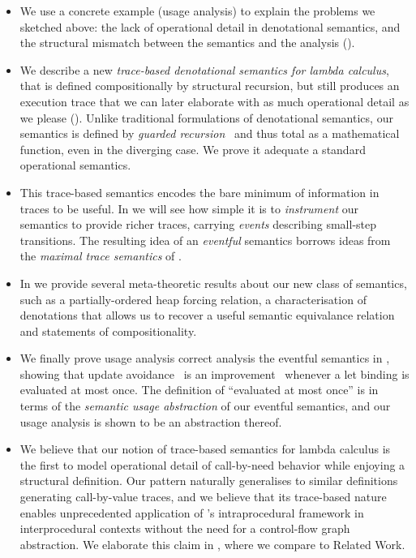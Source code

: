 \begin{itemize}
\item We use a concrete example (usage analysis) to explain the problems we sketched
  above: the lack of operational detail in denotational semantics, and the structural mismatch
  between the semantics and the analysis ().
\item We describe a new \emph{trace-based denotational semantics for lambda calculus},
  that is defined compositionally by structural recursion, but still produces an execution
  trace that we can later elaborate with as much operational detail as we please ().
  Unlike traditional formulations of denotational semantics, our semantics
  is defined by \emph{guarded recursion}~\citep{gdtt} and thus total as a
  mathematical function, even in the diverging case.
  We prove it adequate \wrt a standard operational semantics.
\item This trace-based semantics encodes the bare minimum of information in traces to be useful.
  In  we will see how simple it is to \emph{instrument} our
  semantics to provide richer traces, carrying \emph{events} describing
  small-step transitions.
  The resulting idea of an \emph{eventful} semantics borrows ideas from the
  \emph{maximal trace semantics} of \citet{Cousot:21}.
\item In  we provide several meta-theoretic results about our
  new class of semantics, such as a partially-ordered heap forcing relation,
  a characterisation of denotations that allows us to recover a useful
  semantic equivalance relation and statements of compositionality.
\item We finally prove usage analysis correct analysis \wrt the
  eventful semantics in , showing that update
  avoidance~\citep{Gustavsson:98} is an
  improvement~\citep{MoranSands:99} whenever a let binding is evaluated at
  most once.
  The definition of ``evaluated at most once'' is in terms of the
  \emph{semantic usage abstraction} of our eventful semantics, and
  our usage analysis is shown to be an abstraction thereof.
\item
  We believe that our notion of trace-based semantics for lambda calculus
  is the first to model operational detail of call-by-need behavior while
  enjoying a structural definition. Our pattern naturally generalises
  to similar definitions generating call-by-value traces, and we believe
  that its trace-based nature enables unprecedented application of
  \citeauthor{Cousot:21}'s intraprocedural framework in interprocedural
  contexts without the need for a control-flow graph abstraction.
  We elaborate this claim in , where we compare to
  Related Work.
\end{itemize}


